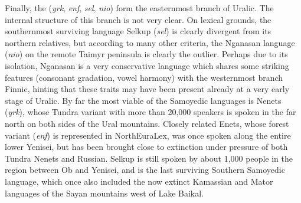 Finally, the  (\textit{yrk}, \textit{enf}, \textit{sel}, \textit{nio}) form the easternmost branch of Uralic. The internal structure of this branch is not very clear. On lexical grounds, the southernmost surviving language Selkup (\textit{sel}) is clearly divergent from its northern relatives, but according to many other criteria, the Nganasan language (\textit{nio}) on the remote Taimyr peninsula is clearly the outlier. Perhaps due to its isolation, Nganasan is a very conservative language which shares some striking features (consonant gradation, vowel harmony) with the westernmost branch Finnic, hinting that these traits may have been present already at a very early stage of Uralic. By far the most viable of the Samoyedic languages is Nenets (\textit{yrk}), whose Tundra variant with more than 20,000 speakers is spoken in the far north on both sides of the Ural mountains. Closely related Enets, whose forest variant (\textit{enf}) is represented in NorthEuraLex, was once spoken along 
the entire lower Yenisei, but has been brought close to extinction under pressure of both Tundra Nenets and Russian. Selkup is still spoken by about 1,000 people in the region between Ob and Yenisei, and is the last surviving Southern Samoyedic language, which once also included the now extinct Kamassian and Mator languages of the Sayan mountains west of Lake Baikal.

